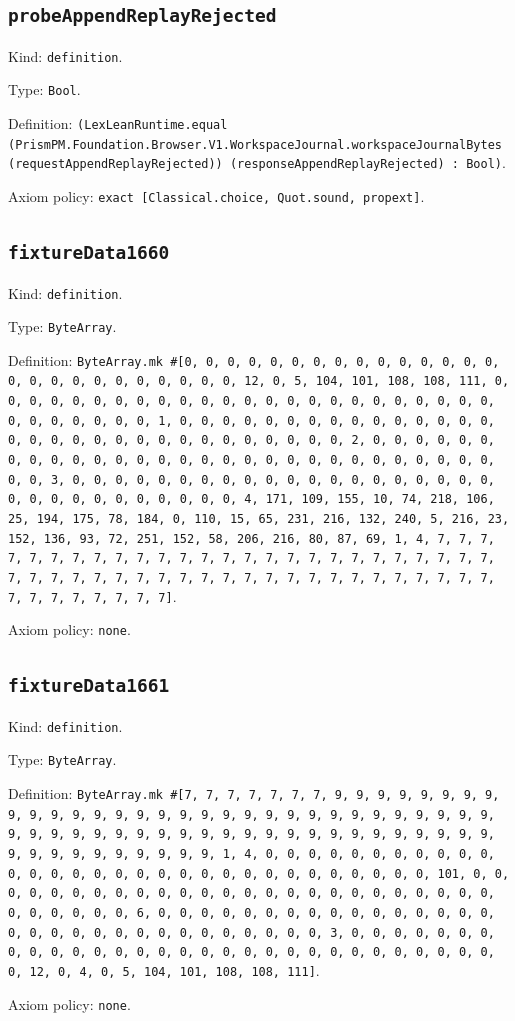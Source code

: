 \documentclass[11pt]{article}
\begin{document}
\subsection*{\texttt{probeAppendReplayRejected}}
\noindent Kind: \texttt{definition}.\par
\noindent Type: \texttt{Bool}.\par
\noindent Definition: \texttt{(LexLeanRuntime.equal (PrismPM.Foundation.Browser.V1.WorkspaceJournal.workspaceJournalBytes (requestAppendReplayRejected)) (responseAppendReplayRejected) : Bool)}.\par
\noindent Axiom policy: \texttt{exact [Classical.choice, Quot.sound, propext]}.\par
\subsection*{\texttt{fixtureData1660}}
\noindent Kind: \texttt{definition}.\par
\noindent Type: \texttt{ByteArray}.\par
\noindent Definition: \texttt{ByteArray.mk \#[0, 0, 0, 0, 0, 0, 0, 0, 0, 0, 0, 0, 0, 0, 0, 0, 0, 0, 0, 0, 0, 0, 0, 0, 0, 0, 12, 0, 5, 104, 101, 108, 108, 111, 0, 0, 0, 0, 0, 0, 0, 0, 0, 0, 0, 0, 0, 0, 0, 0, 0, 0, 0, 0, 0, 0, 0, 0, 0, 0, 0, 0, 0, 0, 0, 1, 0, 0, 0, 0, 0, 0, 0, 0, 0, 0, 0, 0, 0, 0, 0, 0, 0, 0, 0, 0, 0, 0, 0, 0, 0, 0, 0, 0, 0, 0, 0, 2, 0, 0, 0, 0, 0, 0, 0, 0, 0, 0, 0, 0, 0, 0, 0, 0, 0, 0, 0, 0, 0, 0, 0, 0, 0, 0, 0, 0, 0, 0, 0, 3, 0, 0, 0, 0, 0, 0, 0, 0, 0, 0, 0, 0, 0, 0, 0, 0, 0, 0, 0, 0, 0, 0, 0, 0, 0, 0, 0, 0, 0, 0, 0, 4, 171, 109, 155, 10, 74, 218, 106, 25, 194, 175, 78, 184, 0, 110, 15, 65, 231, 216, 132, 240, 5, 216, 23, 152, 136, 93, 72, 251, 152, 58, 206, 216, 80, 87, 69, 1, 4, 7, 7, 7, 7, 7, 7, 7, 7, 7, 7, 7, 7, 7, 7, 7, 7, 7, 7, 7, 7, 7, 7, 7, 7, 7, 7, 7, 7, 7, 7, 7, 7, 7, 7, 7, 7, 7, 7, 7, 7, 7, 7, 7, 7, 7, 7, 7, 7, 7, 7, 7, 7, 7, 7, 7, 7, 7]}.\par
\noindent Axiom policy: \texttt{none}.\par
\subsection*{\texttt{fixtureData1661}}
\noindent Kind: \texttt{definition}.\par
\noindent Type: \texttt{ByteArray}.\par
\noindent Definition: \texttt{ByteArray.mk \#[7, 7, 7, 7, 7, 7, 7, 9, 9, 9, 9, 9, 9, 9, 9, 9, 9, 9, 9, 9, 9, 9, 9, 9, 9, 9, 9, 9, 9, 9, 9, 9, 9, 9, 9, 9, 9, 9, 9, 9, 9, 9, 9, 9, 9, 9, 9, 9, 9, 9, 9, 9, 9, 9, 9, 9, 9, 9, 9, 9, 9, 9, 9, 9, 9, 9, 9, 9, 9, 9, 9, 1, 4, 0, 0, 0, 0, 0, 0, 0, 0, 0, 0, 0, 0, 0, 0, 0, 0, 0, 0, 0, 0, 0, 0, 0, 0, 0, 0, 0, 0, 0, 0, 0, 101, 0, 0, 0, 0, 0, 0, 0, 0, 0, 0, 0, 0, 0, 0, 0, 0, 0, 0, 0, 0, 0, 0, 0, 0, 0, 0, 0, 0, 0, 0, 0, 6, 0, 0, 0, 0, 0, 0, 0, 0, 0, 0, 0, 0, 0, 0, 0, 0, 0, 0, 0, 0, 0, 0, 0, 0, 0, 0, 0, 0, 0, 0, 0, 3, 0, 0, 0, 0, 0, 0, 0, 0, 0, 0, 0, 0, 0, 0, 0, 0, 0, 0, 0, 0, 0, 0, 0, 0, 0, 0, 0, 0, 0, 0, 0, 12, 0, 4, 0, 5, 104, 101, 108, 108, 111]}.\par
\noindent Axiom policy: \texttt{none}.\par
\end{document}
